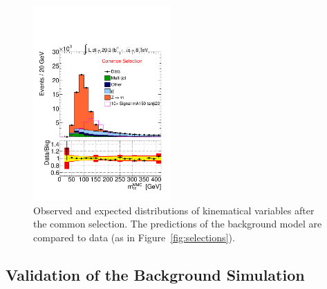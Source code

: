 \begin{figure}[p]
\begin{center}
            \includegraphics[page=7,width=0.47\textwidth]{figure/final_plots/presel_total_final.pdf}


    \end{center}
    \caption{ 
	Observed and expected distributions of  kinematical variables after the common selection. 
	The predictions of the  background model are compared to  data (as in Figure~\ref{fig:selections}).}
   \label{fig:validation}
\end{figure}



\subsection{Validation of the \ttbar Background Simulation}
\label{sec:top_est}

